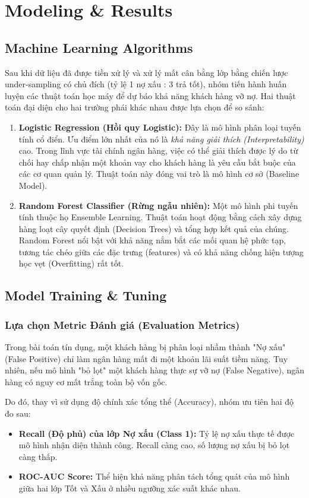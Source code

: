 \section{Modeling \& Results}

\subsection{Machine Learning Algorithms}
Sau khi dữ liệu đã được tiền xử lý và xử lý mất cân bằng lớp bằng chiến lược under-sampling có chủ đích (tỷ lệ 1 nợ xấu : 3 trả tốt), nhóm tiến hành huấn luyện các thuật toán học máy để dự báo khả năng khách hàng vỡ nợ. Hai thuật toán đại diện cho hai trường phái khác nhau được lựa chọn để so sánh:

\begin{enumerate}
    \item \textbf{Logistic Regression (Hồi quy Logistic):} Đây là mô hình phân loại tuyến tính cổ điển. Ưu điểm lớn nhất của nó là \textit{khả năng giải thích (Interpretability)} cao. Trong lĩnh vực tài chính ngân hàng, việc có thể giải thích được lý do từ chối hay chấp nhận một khoản vay cho khách hàng là yêu cầu bắt buộc của các cơ quan quản lý. Thuật toán này đóng vai trò là mô hình cơ sở (Baseline Model).
    \item \textbf{Random Forest Classifier (Rừng ngẫu nhiên):} Một mô hình phi tuyến tính thuộc họ Ensemble Learning. Thuật toán hoạt động bằng cách xây dựng hàng loạt cây quyết định (Decision Trees) và tổng hợp kết quả của chúng. Random Forest nổi bật với khả năng nắm bắt các mối quan hệ phức tạp, tương tác chéo giữa các đặc trưng (features) và có khả năng chống hiện tượng học vẹt (Overfitting) rất tốt.
\end{enumerate}

\subsection{Model Training \& Tuning}
\subsubsection{Lựa chọn Metric Đánh giá (Evaluation Metrics)}
Trong bài toán tín dụng, một khách hàng bị phân loại nhầm thành "Nợ xấu" (False Positive) chỉ làm ngân hàng mất đi một khoản lãi suất tiềm năng. Tuy nhiên, nếu mô hình "bỏ lọt" một khách hàng thực sự vỡ nợ (False Negative), ngân hàng có nguy cơ mất trắng toàn bộ vốn gốc. 

Do đó, thay vì sử dụng độ chính xác tổng thể (Accuracy), nhóm ưu tiên hai độ đo sau:
\begin{itemize}
    \item \textbf{Recall (Độ phủ) của lớp Nợ xấu (Class 1):} Tỷ lệ nợ xấu thực tế được mô hình nhận diện thành công. Recall càng cao, số lượng nợ xấu bị bỏ lọt càng thấp.
    \item \textbf{ROC-AUC Score:} Thể hiện khả năng phân tách tổng quát của mô hình giữa hai lớp Tốt và Xấu ở nhiều ngưỡng xác suất khác nhau.
\end{itemize}


